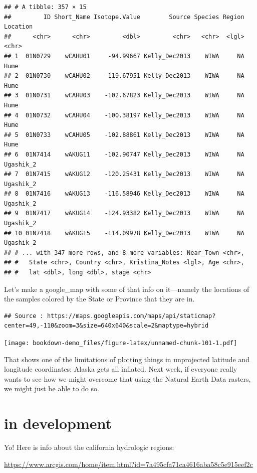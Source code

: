 \documentclass[]{book}
\theoremstyle{definition}
\theoremstyle{definition}
\theoremstyle{remark}
\begin{document}
\begin{verbatim}
## # A tibble: 357 × 15
##         ID Short_Name Isotope.Value        Source Species Region  Location
##      <chr>      <chr>         <dbl>         <chr>   <chr>  <lgl>     <chr>
## 1  01N0729    wCAHU01     -94.99667 Kelly_Dec2013    WIWA     NA      Hume
## 2  01N0730    wCAHU02    -119.67951 Kelly_Dec2013    WIWA     NA      Hume
## 3  01N0731    wCAHU03    -102.67823 Kelly_Dec2013    WIWA     NA      Hume
## 4  01N0732    wCAHU04    -100.38197 Kelly_Dec2013    WIWA     NA      Hume
## 5  01N0733    wCAHU05    -102.88861 Kelly_Dec2013    WIWA     NA      Hume
## 6  01N7414    wAKUG11    -102.90747 Kelly_Dec2013    WIWA     NA Ugashik_2
## 7  01N7415    wAKUG12    -120.25431 Kelly_Dec2013    WIWA     NA Ugashik_2
## 8  01N7416    wAKUG13    -116.58946 Kelly_Dec2013    WIWA     NA Ugashik_2
## 9  01N7417    wAKUG14    -124.93382 Kelly_Dec2013    WIWA     NA Ugashik_2
## 10 01N7418    wAKUG15    -114.09978 Kelly_Dec2013    WIWA     NA Ugashik_2
## # ... with 347 more rows, and 8 more variables: Near_Town <chr>,
## #   State <chr>, Country <chr>, Kristina_Notes <lgl>, Age <chr>,
## #   lat <dbl>, long <dbl>, stage <chr>
\end{verbatim}

Let's make a google\_map with some of that info on it---namely the
locations of the samples colored by the State or Province that they are
in.

\begin{verbatim}
## Source : https://maps.googleapis.com/maps/api/staticmap?center=49,-110&zoom=3&size=640x640&scale=2&maptype=hybrid
\end{verbatim}

\texttt{[image: bookdown-demo\_files/figure-latex/unnamed-chunk-101-1.pdf]}

That shows one of the limitations of plotting things in unprojected
latitude and longitude coordinates: Alaska gets all inflated. Next week,
if everyone really wants to see how we might overcome that using the
Natural Earth Data rasters, we might just be able to do so.

\chapter{in development}\label{in-development}

Yo! Here is info about the california hydrologic regions:

\url{https://www.arcgis.com/home/item.html?id=7a495cfa71ca4616aba58c5e915eef2c}
\end{document}
